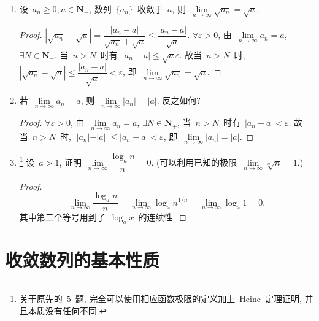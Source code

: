 \documentclass[UTF8,a4paper,10pt,twoside]{book}
\begin{document}
\begin{enumerate}
\begin{proof}
	      \end{proof}
	\item 设~$a_n\geqslant 0, n\in\mathbf{N}_{+}$, 数列~$\{a_n\}$~收敛于~$a$, 则~$\lim\limits_{n\to\infty}\sqrt{a_n}=\sqrt{a}$.
	      \begin{proof}
		      $|\sqrt{a_n}-\sqrt{a}|=\dfrac{|a_n-a|}{\sqrt{a_n}+\sqrt{a}}\leqslant\dfrac{|a_n-a|}{\sqrt{a}}$. $\forall\varepsilon>0$, 由~$\lim\limits_{n\to\infty} a_n=a$, $\exists N\in\mathbf{N}_{+}$, 当~$n>N$~时有~$|a_n-a|\leqslant\sqrt{a}\varepsilon$. 故当~$n>N$~时, ~$|\sqrt{a_n}-\sqrt{a}|\leqslant\dfrac{|a_n-a|}{\sqrt{a}}<\varepsilon$, 即~$\lim\limits_{n\to\infty}\sqrt{a_n}=\sqrt{a}$.\qedhere
	      \end{proof}
	\item 若~$\lim\limits_{n\to\infty} a_n=a$, 则~$\lim\limits_{n\to\infty}|a_n|=|a|$. 反之如何?
	      \begin{proof}
		      $\forall\varepsilon>0$, 由~$\lim\limits_{n\to\infty} a_n=a$, $\exists N\in\mathbf{N}_{+}$, 当~$n>N$~时有~$|a_n-a|<\varepsilon$. 故当~$n>N$~时, $||a_n|-|a||\leqslant|a_n-a|<\varepsilon$, 即~$\lim\limits_{n\to\infty}|a_n|=|a|$.\qedhere
	      \end{proof}
	\item \footnote{关于原先的~$5$~题, 完全可以使用相应函数极限的定义加上~Heine~定理证明, 并且本质没有任何不同.} 设~$a>1$, 证明~$\lim\limits_{n\to\infty}\dfrac{\log_a{n}}{n}=0$. (可以利用已知的极限~$\lim\limits_{n\to\infty}\sqrt[n]{n}=1$.)
	      \begin{proof}
		      \[
			      \lim\limits_{n\to\infty}\dfrac{\log_a{n}}{n}=\lim\limits_{n\to\infty}\log_a{n^{1/n}}=\lim\limits_{n\to\infty}\log_a{1}=0.
		      \]
		      其中第二个等号用到了~$\log_a{x}$~的连续性.\qedhere
	      \end{proof}
\end{enumerate}

\section{收敛数列的基本性质}
\end{document}
